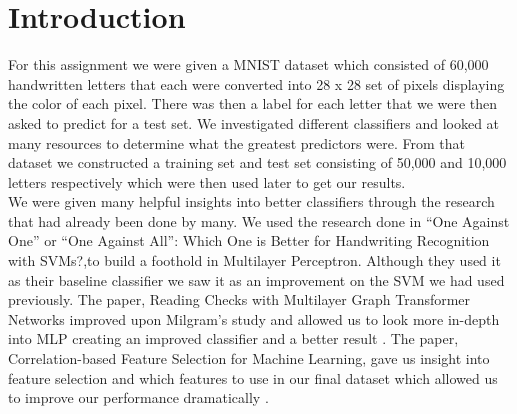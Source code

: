 
\section{Introduction}
\label{sec:intro}

For this assignment we were given a MNIST dataset which consisted of 60,000
handwritten letters that each were converted into 28 x 28 set of
pixels displaying the color of each pixel. There was then a label for
each letter that we were then asked to predict for a test set. We
investigated different classifiers and looked at many resources to
determine what the greatest predictors were. From that dataset we constructed a
training set and test set consisting of 50,000 and 10,000 letters respectively
which were then used later to get our results.\\ 

We were given many helpful insights into better classifiers through the research
that had already been done by many. We used the research done in “One Against
One” or “One Against All”: Which One is Better for Handwriting Recognition with
SVMs?,to build a foothold in Multilayer Perceptron\cite{milgram}. Although they
used it as their baseline classifier we saw it as an improvement on the SVM we
had used previously. The paper, Reading Checks with Multilayer Graph Transformer
Networks improved upon Milgram's study and allowed us to look more in-depth into
MLP creating an improved classifier and a better result \cite{cun}. The paper,
Correlation-based Feature Selection for Machine Learning, gave us insight into
feature selection and which features to use in our final dataset which allowed
us to improve our performance dramatically \cite{hall}.
